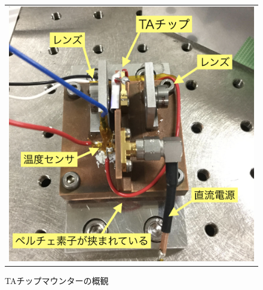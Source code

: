 \documentclass[uplatex, dvipdfmx, a4paper, report, papersize, 11pt]{jsbook}
\begin{document}
\begin{figure}[htpb]
  \centering
    \begin{tabular}{c}


      \begin{minipage}{0.50\hsize}
        \centering
          \includegraphics[keepaspectratio,  scale=0.30,  angle=0]
                          {figures/chapter4/TA_mounter_photo_comments.png}
                          \caption{TAチップマウンターの概観}
                          \label{TA_mounter_photo_comments}
      \end{minipage}


\end{tabular}
\end{figure}
\end{document}
